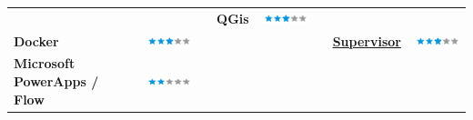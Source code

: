 \documentclass[]{friggeri-cv}
\begin{document}
\begin{table}[!h]
\begin{tabular}{L{2.25cm}cL{1cm}L{2.25cm}cL{1cm}L{2.25cm}c}
		& 
		&&
		\textbf{QGis} & \includegraphics[scale=0.40]{img/3stars.png} \\
		\textbf{Docker}&
		\includegraphics[scale=0.40]{img/3stars.png} &&
		&
		&&
		\href{https://snowdengroup.com/software/supervisor/}{\textbf{Supervisor}}&
		\includegraphics[scale=0.40]{img/3stars.png}\\
		\textbf{Microsoft PowerApps / Flow}&
		\includegraphics[scale=0.40]{img/2stars.png}&&
		&
		&&
		&
	\end{tabular}
\end{table}
\end{document}
